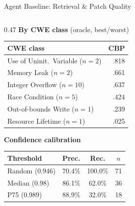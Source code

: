 \documentclass[aspectratio=169,10pt]{beamer}
\begin{document}
\begin{frame}{Agent Baseline: Retrieval \& Patch Quality}
\begin{columns}[T]
\begin{column}{0.47\textwidth}
  \vspace{0.5em}
  {\scriptsize\textbf{By CWE class} (oracle, best/worst)}

  \vspace{0.2em}
  {\scriptsize
  \renewcommand{\arraystretch}{1.15}
  \begin{tabular}{lr}
    \toprule
    \textbf{CWE class} & \textbf{CBP} \\
    \midrule
    \rowcolor{hit!10}
    Use of Uninit.\ Variable ($n{=}2$) & .818 \\
    Memory Leak ($n{=}2$) & .661 \\
    Integer Overflow ($n{=}10$) & .637 \\
    \midrule
    Race Condition ($n{=}5$) & .424 \\
    \rowcolor{miss!10}
    Out-of-bounds Write ($n{=}1$) & .239 \\
    \rowcolor{miss!10}
    Resource Lifetime ($n{=}1$) & .025 \\
    \bottomrule
  \end{tabular}}

  \vspace{0.4em}
  \textbf{Confidence calibration}

  \vspace{0.2em}
  {\scriptsize
  \renewcommand{\arraystretch}{1.15}
  \begin{tabular}{lccc}
    \toprule
    \textbf{Threshold} & \textbf{Prec.} & \textbf{Rec.} & \textbf{$n$} \\
    \midrule
    \rowcolor{hit!10}
    Random (0.946) & 70.4\% & 100.0\% & 71 \\
    Median (0.98)  & 86.1\% & 62.0\% & 36 \\
    P75 (0.989)    & 88.9\% & 32.0\% & 18 \\
    \bottomrule
  \end{tabular}}

\end{column}
\end{columns}
\end{frame}
\end{document}
